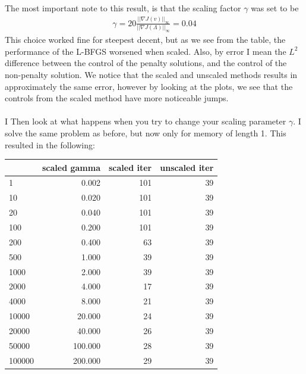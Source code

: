 \documentclass[11pt,a4paper]{article}
\begin{document}
The most important note to this result, is that the scaling factor $\gamma$ was set to be 
\begin{align*}
\gamma = 20\frac{||\nabla J(v)||_{\infty}}{||\nabla J(\Lambda)||_{\infty}}=0.04
\end{align*}
This choice worked fine for steepest decent, but as we see from the table, the performance of the L-BFGS worsened when scaled. Also, by error I mean the $L^2$ difference between the control of the penalty solutions, and the control of the non-penalty solution. We notice that the scaled and unscaled methods results in approximately the same error, however by looking at the plots, we see that the controls from the scaled method have more noticeable jumps.
\\
\\
I Then look at what happens when you try to change your scaling parameter $\gamma$. I solve the same problem as before, but now only for memory of length 1. This resulted in the following:
\\
\begin{tabular}{lrrr}
\toprule
{} &  scaled gamma &  scaled iter &  unscaled iter \\
\midrule
1      &         0.002 &          101 &             39 \\
10     &         0.020 &          101 &             39 \\
20     &         0.040 &          101 &             39 \\
100    &         0.200 &          101 &             39 \\
200    &         0.400 &           63 &             39 \\
500    &         1.000 &           39 &             39 \\
1000   &         2.000 &           39 &             39 \\
2000   &         4.000 &           17 &             39 \\
4000   &         8.000 &           21 &             39 \\
10000  &        20.000 &           24 &             39 \\
20000  &        40.000 &           26 &             39 \\
50000  &       100.000 &           28 &             39 \\
100000 &       200.000 &           29 &             39 \\
\bottomrule
\end{tabular}
\end{document}
